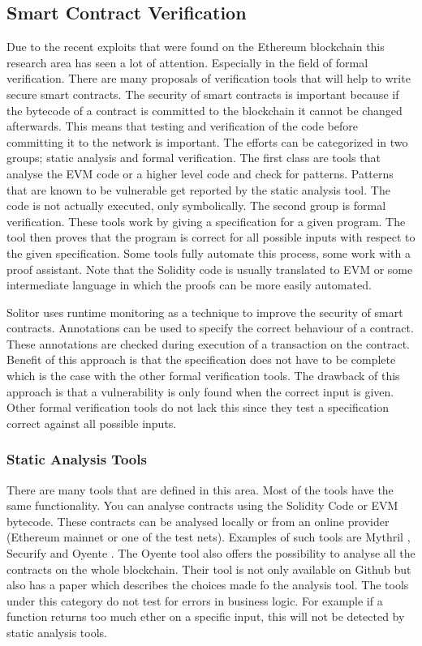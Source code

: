 \documentclass[a4paper]{article}
\begin{document}
\subsection{Smart Contract Verification}
Due to the recent exploits that were found on the Ethereum blockchain this research area has seen a lot of attention. Especially in the field of formal verification. There are many proposals of verification tools that will help to write secure smart contracts. The security of smart contracts is important because if the bytecode of a contract is committed to the blockchain it cannot be changed afterwards. This means that testing and verification of the code before committing it to the network is important. The efforts can be categorized in two groups; static analysis and formal verification. The first class are tools that analyse the EVM code or a higher level code and check for patterns. Patterns that are known to be vulnerable get reported by the static analysis tool. The code is not actually executed, only symbolically. The second group is formal verification. These tools work by giving a specification for a given program. The tool then proves that the program is correct for all possible inputs with respect to the given specification. Some tools fully automate this process, some work with a proof assistant. Note that the Solidity code is usually translated to EVM or some intermediate language in which the proofs can be more easily automated. \par
Solitor uses runtime monitoring as a technique to improve the security of smart contracts. Annotations can be used to specify the correct behaviour of a contract. These annotations are checked during execution of a transaction on the contract. Benefit of this approach is that the specification does not have to be complete which is the case with the other formal verification tools. The drawback of this approach is that a vulnerability is only found when the correct input is given. Other formal verification tools do not lack this since they test a specification correct against all possible inputs.

\subsubsection{Static Analysis Tools}
There are many tools that are defined in this area. Most of the tools have the same functionality. You can analyse contracts using the Solidity Code or EVM bytecode. These contracts can be analysed locally or from an online provider (Ethereum mainnet or one of the test nets). Examples of such tools are Mythril \cite{mythrilrepo}, Securify \cite{securifywebsite} and Oyente \cite{luu2016making}. The Oyente tool also offers the possibility to analyse all the contracts on the whole blockchain. Their tool is not only available on Github but also has a paper which describes the choices made fo the analysis tool. The tools under this category do not test for errors in business logic. For example if a function returns too much ether on a specific input, this will not be detected by static analysis tools. 
\end{document}
